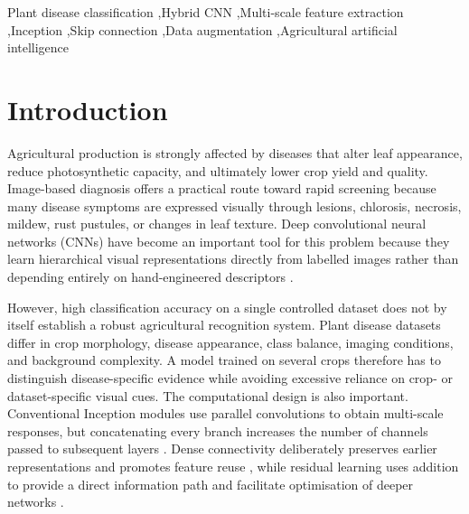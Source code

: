 \documentclass[a4paper,fleqn]{cas-dc}
\begin{document}
\begin{abstract}
The currently verified result artifacts report 97.81\% accuracy for the three-class Wheat primary experiment, 53.55\% for the six-class Cotton experiment, and 97.67\% for the 15-class PlantVillage experiment. For the 24-class architectural comparison, the verified Standard Inception and ResNet-style runs obtain 95.33\% and 96.04\% accuracy, respectively. These values are copied from committed metric files rather than reconstructed from an earlier manuscript draft. The supplied final \texttt{build\_model()} definition has 934,200 parameters when the displayed Keras layer counts are summed; this architecture-level calculation is kept distinct from the parameter counts of older executed notebooks. The separation between verified evidence and unresolved historical results is intentional and prevents favorable but untraceable values from entering the manuscript.
\end{abstract}

\begin{keywords}
Plant disease classification \sep Hybrid CNN \sep Multi-scale feature extraction \sep Inception \sep Skip connection \sep Data augmentation \sep Agricultural artificial intelligence
\end{keywords}
\maketitle

\section{Introduction}
Agricultural production is strongly affected by diseases that alter leaf appearance, reduce photosynthetic capacity, and ultimately lower crop yield and quality. Image-based diagnosis offers a practical route toward rapid screening because many disease symptoms are expressed visually through lesions, chlorosis, necrosis, mildew, rust pustules, or changes in leaf texture. Deep convolutional neural networks (CNNs) have become an important tool for this problem because they learn hierarchical visual representations directly from labelled images rather than depending entirely on hand-engineered descriptors \citep{hughes2015,mohanty2016}.

However, high classification accuracy on a single controlled dataset does not by itself establish a robust agricultural recognition system. Plant disease datasets differ in crop morphology, disease appearance, class balance, imaging conditions, and background complexity. A model trained on several crops therefore has to distinguish disease-specific evidence while avoiding excessive reliance on crop- or dataset-specific visual cues. The computational design is also important. Conventional Inception modules use parallel convolutions to obtain multi-scale responses, but concatenating every branch increases the number of channels passed to subsequent layers \citep{szegedy2015}. Dense connectivity deliberately preserves earlier representations and promotes feature reuse \citep{huang2017}, while residual learning uses addition to provide a direct information path and facilitate optimisation of deeper networks \citep{he2016}.
\end{document}
